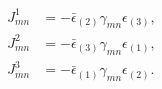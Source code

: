\begin{equation}
\begin{aligned}
   J^1_{mn} &= - \bar\epsilon_{(2)}\gamma_{mn}\epsilon_{(3)} , \\
   J^2_{mn} &= - \bar\epsilon_{(3)}\gamma_{mn}\epsilon_{(1)} , \\
   J^3_{mn} &= - \bar\epsilon_{(1)}\gamma_{mn}\epsilon_{(2)} .
\end{aligned}
\end{equation}

